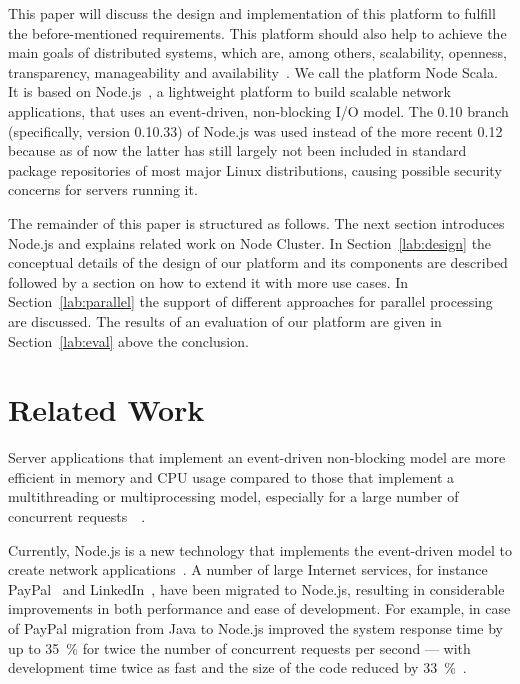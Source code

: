 \documentclass[10pt,conference,letterpaper]{IEEEtran}
\begin{document}
This paper will discuss the design and implementation of this platform to fulfill the before-mentioned requirements. This platform should also help to achieve the main goals of distributed systems, which are, among others, scalability, openness, transparency, manageability and availability~\cite{Tanenbaum:2006:DSP:1202502}. We call the platform Node Scala. It is based on Node.js~\cite{Node01}, a lightweight platform to build scalable network applications, that uses an event-driven, non-blocking I/O model. The 0.10 branch (specifically, version 0.10.33) of Node.js was used instead of the more recent 0.12 because as of now the latter has still largely not been included in standard package repositories of most major Linux distributions, causing possible security concerns for servers running it.

The remainder of this paper is structured as follows. The next section introduces Node.js and explains related work on Node Cluster. In Section~\ref{lab:design} the conceptual details of the design of our platform and its components are described followed by a section on how to extend it with more use cases. In Section~\ref{lab:parallel} the support of different approaches for parallel processing are discussed. The results of an evaluation of our platform are given in Section~\ref{lab:eval} above the conclusion.


\section{Related Work}

\IEEEpubidadjcol

Server applications that implement an event-driven non-blocking model
are more efficient in memory and CPU usage compared to those that
implement a multithreading or multiprocessing model, especially for a
large number of concurrent requests~\cite{C10K}~\cite{Syed:2014:BN:2723784}.

Currently, Node.js is a new technology that implements the
event-driven model to create network
applications~\cite{Cantelon:2013:NA:2601501}. A number of large
Internet services, for instance PayPal~\cite{PayPal} and
LinkedIn~\cite{2014:NLP:2556647.2556656}, have been migrated to
Node.js, resulting in considerable improvements in both performance
and ease of development. For example, in case of PayPal migration from
Java to Node.js improved the system response time by up to 35~\% for
twice the number of concurrent requests per second --- with
development time twice as fast and the size of the code reduced by
33~\%~\cite{PayPal}.
\end{document}
